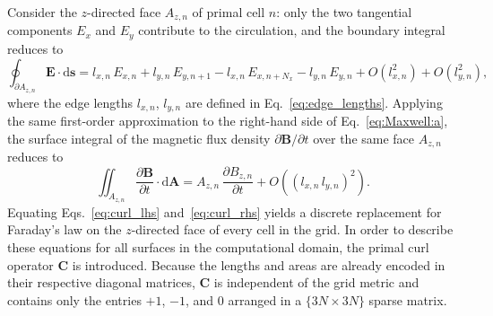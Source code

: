 Consider the $z$-directed face $A_{z,n}$ of primal cell $n$: only the two tangential components $E_x$ and $E_y$ contribute to the circulation, and the boundary integral reduces to
\begin{equation}
\oint_{\partial A_{z,n}} \mathbf{E}\cdot\mathrm{d}\mathbf{s} = l_{x,n}\,E_{x,n} + l_{y,n}\,E_{y,n+1} - l_{x,n}\,E_{x,n+N_x} - l_{y,n}\,E_{y,n}
+ O(l_{x,n}^2) + O(l_{y,n}^2),
\label{eq:curl_lhs}
\end{equation}
where the edge lengths $l_{x,n}$, $l_{y,n}$ are defined in Eq.~\eqref{eq:edge_lengths}. Applying the same first-order approximation to the right-hand side of Eq.~\eqref{eq:Maxwell:a}, the surface integral of the magnetic flux density $\partial\mathbf{B}/\partial t$ over the same face $A_{z,n}$ reduces to
\begin{equation}
\iint_{A_{z,n}} \frac{\partial \mathbf{B}}{\partial t}\cdot\mathrm{d}\mathbf{A} = A_{z,n}\,\frac{\partial B_{z,n}}{\partial t}
+ O\!\left((l_{x,n}\,l_{y,n})^2\right).
\label{eq:curl_rhs}
\end{equation}
Equating Eqs.~\eqref{eq:curl_lhs} and~\eqref{eq:curl_rhs} yields a discrete replacement for Faraday's law on the $z$-directed face of every cell in the grid. In order to describe these equations for all surfaces in the computational domain, the primal curl operator $\mathbf{C}$ is introduced. Because the lengths and areas are already encoded in their respective diagonal matrices, $\mathbf{C}$ is independent of the grid metric and contains only the entries $+1$, $-1$, and $0$ arranged in a $\{3N \times 3N\}$ sparse matrix.

